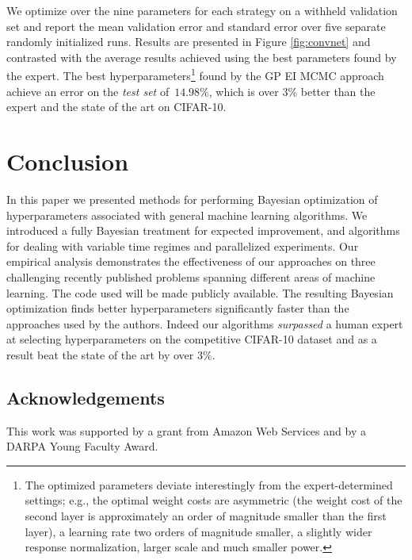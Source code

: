 \documentclass[aos,preprint]{imsart}
\begin{document}
We optimize over the nine parameters for each strategy on a withheld
validation set and report the mean validation error and standard error
over five separate randomly initialized runs.  Results are presented
in Figure \ref{fig:convnet} and contrasted with the average results
achieved using the best parameters found by the expert.  The best
hyperparameters\footnote{The optimized parameters deviate
  interestingly from the expert-determined settings; 
  e.g., the optimal weight costs are asymmetric (the weight cost of the
  second layer is approximately an order of magnitude smaller than the
  first layer), a learning rate two orders of magnitude smaller,
  a slightly wider response normalization, larger scale and much
  smaller power.} found by the GP EI MCMC approach achieve an error on
the \emph{test set} of~$14.98\%$, which is over 3\% better than the
expert and the state of the art on CIFAR-10.

\section{Conclusion}
In this paper we presented methods for performing Bayesian
optimization of hyperparameters associated with general machine
learning algorithms.  We introduced a fully Bayesian treatment for
expected improvement, and algorithms for dealing with variable time
regimes and parallelized experiments.  Our empirical analysis
demonstrates the effectiveness of our approaches on three challenging
recently published problems spanning different areas of machine
learning.  The code used will be made publicly available.  The
resulting Bayesian optimization finds better hyperparameters
significantly faster than the approaches used by the authors. Indeed
our algorithms \emph{surpassed} a human expert at selecting
hyperparameters on the competitive CIFAR-10 dataset and as a result
beat the state of the art by over 3\%.

\subsection*{Acknowledgements}
This work was supported by a grant from Amazon Web Services and by a
DARPA Young Faculty Award.

 
\end{document}

